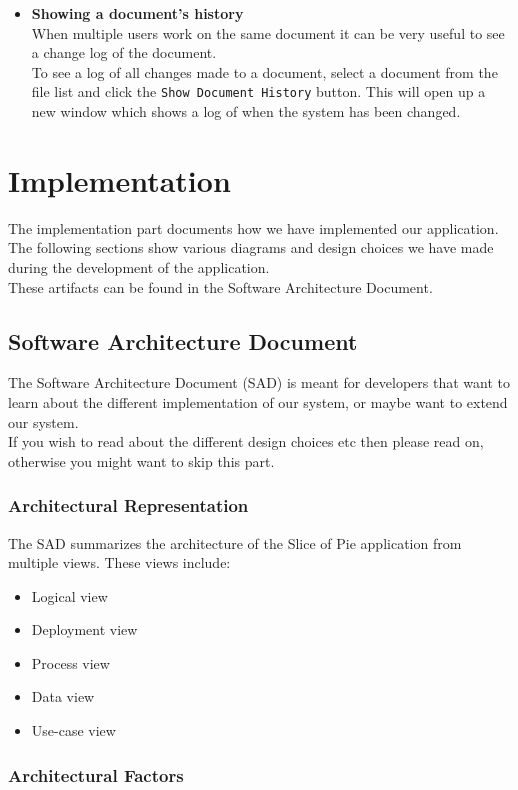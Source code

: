 \documentclass[11pt]{article}
\begin{document}
\begin{itemize}
\item \textbf{Showing a document's history} \\
\label{sec-3-4-2-5}%
When multiple users work on the same document it can be very useful to see a change log of the document. \\
To see a log of all changes made to a document, select a document from the file list and click the \texttt{Show Document History} button. This will open up a new window which shows a log of when the system has been changed.

\end{itemize} %
\section{Implementation}
\label{sec-4}
The implementation part documents how we have implemented our application. \\
The following sections show various diagrams and design choices we have made during the development of the application. \\
These artifacts can be found in the Software Architecture Document.
\subsection{Software Architecture Document}
\label{sec-4-1}
The Software Architecture Document (SAD) is meant for developers that want to learn about the different implementation of our system, or maybe want to extend our system. \\
If you wish to read about the different design choices etc then please read on, otherwise you might want to skip this part.
\subsubsection{Architectural Representation}
\label{sec-4-1-1}

The SAD summarizes the architecture of the Slice of Pie application from multiple views. These views include:
\begin{itemize}
\item Logical view
\item Deployment view
\item Process view
\item Data view
\item Use-case view
\end{itemize}
\subsubsection{Architectural Factors}
\label{sec-4-1-2}
\end{document}
